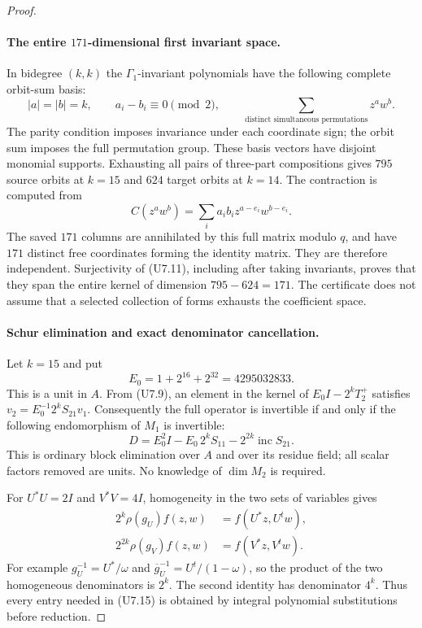 \documentclass[11pt,a4paper]{article}
\theoremstyle{definition}
\begin{document}
\begin{proof}
\paragraph{The entire $171$-dimensional first invariant space.}
In bidegree $(k,k)$ the $\Gamma_1$-invariant polynomials have the
following complete orbit-sum basis:
\[
 |a|=|b|=k,\qquad a_i-b_i\equiv0\pmod2,
 \qquad
 \sum_{\text{distinct simultaneous permutations}}z^a w^b.
 \tag{U7.14}
\]
The parity condition imposes invariance under each coordinate sign;
the orbit sum imposes the full permutation group. These basis
vectors have disjoint monomial supports. Exhausting all pairs of
three-part compositions gives $795$ source orbits at $k=15$ and
$624$ target orbits at $k=14$. The contraction is computed from
\[
 C(z^aw^b)=\sum_i a_i b_i z^{a-e_i}w^{b-e_i}.
\]
The saved $171$ columns are annihilated by this full matrix modulo
$q$, and have $171$ distinct free coordinates forming the identity
matrix. They are therefore independent. Surjectivity of (U7.11),
including after taking invariants, proves that they span the entire
kernel of dimension $795-624=171$. The certificate does not assume
that a selected collection of forms exhausts the coefficient space.

\paragraph{Schur elimination and exact denominator cancellation.}
Let $k=15$ and put
\[
 E_0=1+2^{16}+2^{32}=4295032833.
\]
This is a unit in $A$. From (U7.9), an element in the kernel of
$E_0I-2^kT_2^+$ satisfies
$v_2=E_0^{-1}2^kS_{21}v_1$. Consequently the full operator is
invertible if and only if the following endomorphism of $M_1$ is
invertible:
\[
 D=E_0^2I-E_0\,2^kS_{11}
                  -2^{2k}\operatorname{inc}S_{21}.
 \tag{U7.15}
\]
This is ordinary block elimination over $A$ and over its residue
field; all scalar factors removed are units. No knowledge of
$\dim M_2$ is required.

For $U^*U=2I$ and $V^*V=4I$, homogeneity in the two sets of
variables gives
\[
 \begin{split}
 2^k\rho(g_U)f(z,w)&=f(U^*z,U^tw),\\
 2^{2k}\rho(g_V)f(z,w)&=f(V^*z,V^tw).
 \end{split}
 \tag{U7.16}
\]
For example $g_U^{-1}=U^*/\omega$ and
$\overline g_U^{-1}=U^t/(1-\omega)$, so the product of the two
homogeneous denominators is $2^k$. The second identity has
denominator $4^k$. Thus every entry needed in (U7.15) is obtained
by integral polynomial substitutions before reduction.


\end{proof}
\end{document}
